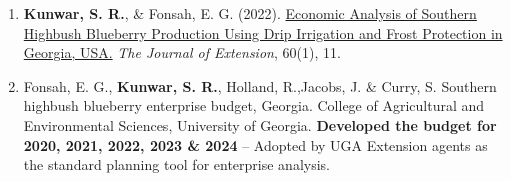\begin{enumerate}[leftmargin = 1.5em]

\item \textbf{Kunwar, S. R.}, \& Fonsah, E. G. (2022). \href{10.34068/joe.60.01.12}{Economic Analysis of Southern Highbush Blueberry Production Using Drip Irrigation and Frost Protection in Georgia, USA.} \textit{The Journal of Extension}, 60(1), 11.

\item Fonsah, E. G., \textbf{Kunwar, S. R.}, Holland, R.,Jacobs, J. \& Curry, S. Southern highbush blueberry enterprise budget, Georgia. College of Agricultural and Environmental Sciences, University of Georgia. \textbf{Developed the budget for 2020, 2021, 2022, 2023 \& 2024} -- Adopted by UGA Extension agents as the standard planning tool for enterprise analysis.


\end{enumerate}